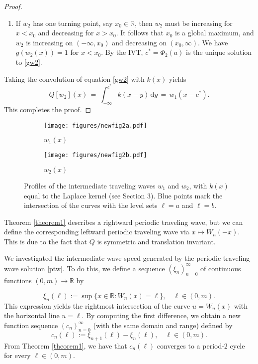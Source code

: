 \documentclass[11pt]{article}
\theoremstyle{definition}
\numberwithin{equation}{section}
\numberwithin{thm}{section}
\newcommand{\wone}{w_1}
\newcommand{\wtwo}{w_2}
\newcommand{\w}{W}
\renewcommand{\a}{a}
\renewcommand{\b}{b}
\newcommand{\m}{m}
\renewcommand{\d}{\,\mathrm{d}}
\begin{document}
\begin{proof}
\begin{enumerate}[{Case} 1.]
\item If $w_2$ has one turning point, say $x_0 \in \mathbb R$, then $w_2$ must be increasing for $x<x_0$ and decreasing for $x>x_0$.
It follows that $x_0$ is a global maximum, and $w_2$ is increasing on $(-\infty,x_0)$ and decreasing on $(x_0,\infty)$.
We have $g(w_2(x))=1$ for $x<x_0$.
By the IVT, $c^* = \Phi_2(\a)$ is the unique solution to \eqref{gw2}.
\end{enumerate}
Taking the convolution of equation \eqref{gw2} with $k(x)$ yields
$$
Q[w_2](x) \,=\, \int_{-\infty}^{c^*} k(x-y) \d y \,=\, w_1(x-c^*).
$$
This completes the proof.
\end{proof}


\begin{figure}[h]
\begin{subfigure}{0.5\textwidth}
\texttt{[image: figures/newfig2a.pdf]}
\caption{$\wone(x)$}
\end{subfigure}
\begin{subfigure}{0.5\textwidth}
\texttt{[image: figures/newfig2b.pdf]}
\caption{$\wtwo(x)$}
\end{subfigure}
\caption{Profiles of the intermediate traveling waves $w_1$ and $w_2$, with $k(x)$ equal to the Laplace kernel (see Section 3).
Blue points mark the intersection of the curves with the level sets $\ell=\a$ and $\ell=\b$.}
\label{fig:fig2}
\end{figure}

Theorem \ref{theorem1} describes a rightward periodic traveling wave, but we can define the corresponding leftward periodic traveling wave via $x\mapsto\w_n(-x)$.
This is due to the fact that $Q$ is symmetric and translation invariant.

We investigated the intermediate wave speed generated by the periodic traveling wave solution \eqref{ptw}.
To do this, we define a sequence $(\xi_{n})_{n=0}^{\infty}$ of continuous functions $(0,\m)\to\mathbb R$ by

\begin{equation}
 \xi_{n}(\ell) := \sup \{ x \in \mathbb R : \w_n(x) = \ell \}, \quad \ell \in (0,\m).
\end{equation}
This expression yields the rightmost intersection of the curve $u=\w_n(x)$ with the horizontal line $u=\ell$.
By computing the first difference, we obtain a new function sequence $(c_n)_{n=0}^{\infty}$ (with the same domain and range) defined by
\begin{equation}
c_n(\ell) := \xi_{n+1}(\ell) - \xi_n(\ell), \quad \ell \in (0,\m).
\end{equation}
From Theorem \ref{theorem1}, we have that $c_n(\ell)$ converges to a period-$2$ cycle for every $\ell \in (0,\m)$.
\end{document}
